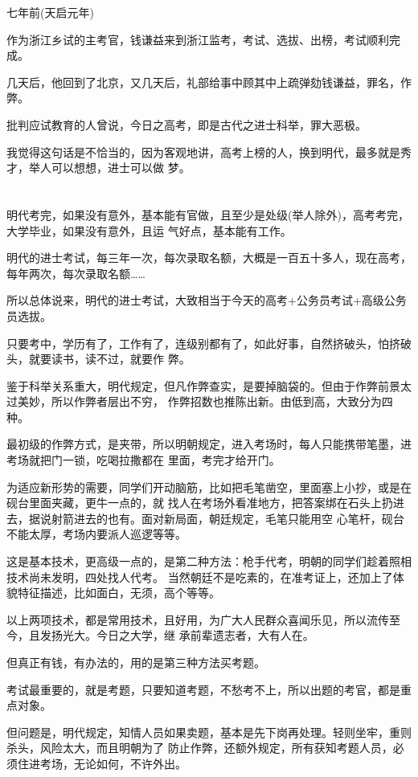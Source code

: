\documentclass[11pt,a4paper,onecolumn]{article}
\begin{document}
七年前(天启元年)

作为浙江乡试的主考官，钱谦益来到浙江监考，考试、选拔、出榜，考试顺利完成。

几天后，他回到了北京，又几天后，礼部给事中顾其中上疏弹劾钱谦益，罪名，作弊。

批判应试教育的人曾说，今日之高考，即是古代之进士科举，罪大恶极。

我觉得这句话是不恰当的，因为客观地讲，高考上榜的人，换到明代，最多就是秀才，举人可以想想，进士可以做
梦。

\section[\thesection]{}

明代考完，如果没有意外，基本能有官做，且至少是处级(举人除外)，高考考完，大学毕业，如果没有意外，且运
气好点，基本能有工作。

明代的进士考试，每三年一次，每次录取名额，大概是一百五十多人，现在高考，每年两次，每次录取名额……

所以总体说来，明代的进士考试，大致相当于今天的高考+公务员考试+高级公务员选拔。

只要考中，学历有了，工作有了，连级别都有了，如此好事，自然挤破头，怕挤破头，就要读书，读不过，就要作
弊。

鉴于科举关系重大，明代规定，但凡作弊查实，是要掉脑袋的。但由于作弊前景太过美妙，所以作弊者层出不穷，
作弊招数也推陈出新。由低到高，大致分为四种。

最初级的作弊方式，是夹带，所以明朝规定，进入考场时，每人只能携带笔墨，进考场就把门一锁，吃喝拉撒都在
里面，考完才给开门。

为适应新形势的需要，同学们开动脑筋，比如把毛笔凿空，里面塞上小抄，或是在砚台里面夹藏，更牛一点的，就
找人在考场外看准地方，把答案绑在石头上扔进去，据说射箭进去的也有。面对新局面，朝廷规定，毛笔只能用空
心笔杆，砚台不能太厚，考场内要派人巡逻等等。

这是基本技术，更高级一点的，是第二种方法：枪手代考，明朝的同学们趁着照相技术尚未发明，四处找人代考。
当然朝廷不是吃素的，在准考证上，还加上了体貌特征描述，比如面白，无须，高个等等。

以上两项技术，都是常用技术，且好用，为广大人民群众喜闻乐见，所以流传至今，且发扬光大。今日之大学，继
承前辈遗志者，大有人在。

但真正有钱，有办法的，用的是第三种方法\myrule 买考题。

考试最重要的，就是考题，只要知道考题，不愁考不上，所以出题的考官，都是重点对象。

但问题是，明代规定，知情人员如果卖题，基本是先下岗再处理。轻则坐牢，重则杀头，风险太大，而且明朝为了
防止作弊，还额外规定，所有获知考题人员，必须住进考场，无论如何，不许外出。
\end{document}
